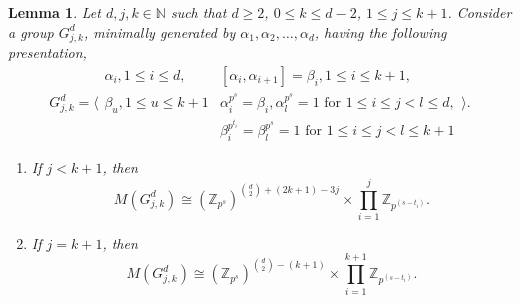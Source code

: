 \documentclass[10pt,a4paper]{amsart}
\newtheorem{lemma}{Lemma}
\newcommand{\Z}{\mathbb{Z}}
\begin{document}
\begin{lemma}  \label{SchurG_{j,k}} 
Let $d,j,k \in \mathbb{N}$ such that $d \geq 2$, $0 \leq k \leq d-2$, ${1 \leq j \leq k+1}$.
   Consider a group $G_{j,k}^d$, minimally generated by $\alpha_1,\alpha_2,\ldots,\alpha_d$, having the following presentation,
\[G_{j,k}^d=\Biggl\langle 
\begin{array}{l|cl}
\alpha_i, 1 \le i \le d,	&  [\alpha_i,\alpha_{i+1}]=\beta_i, 1 \leq i \leq k+1,   \\
	\beta_u,1 \le u \le k+1 &  \alpha_i^{p^s}=\beta_i, \alpha_l^{p^s}=1 \text{ for } 1 \leq i \leq j <l \leq d, \\
     &  \beta_i^{p^{t_i}}= \beta_l^{p^s}=1 \text{ for }  1 \leq i \leq j < l \leq k+1
\end{array}
\Biggr\rangle.\]
\begin{enumerate} 
    \item [(i)]  If $j < k+1$, then 
$$M(G_{j,k}^d) \cong (\Z_{p^s})^{\binom{d}{2}+(2k+1)-3j} \times \prod_{i=1}^{j}\Z_{p^{(s-t_i)}} .
$$
\item [(ii)] If $j=k+1$, then 
$$M(G_{j,k}^d) \cong (\Z_{p^s})^{\binom{d}{2}-(k+1)} \times\prod_{i=1}^{k+1}\Z_{p^{(s-t_i)}} .$$
\end{enumerate}
\end{lemma}
\end{document}

